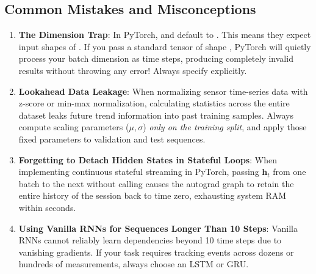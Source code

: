 \subsection{Common Mistakes and Misconceptions}\label{subsec:mistakes}

\begin{warning}
\begin{enumerate}
    \item \textbf{The  Dimension Trap}: In PyTorch,  and  default to . This means they expect input shapes of . If you pass a standard tensor of shape , PyTorch will quietly process your batch dimension as time steps, producing completely invalid results without throwing any error! Always specify  explicitly.
    \item \textbf{Lookahead Data Leakage}: When normalizing sensor time-series data with z-score or min-max normalization, calculating statistics across the entire dataset leaks future trend information into past training samples. Always compute scaling parameters ($\mu, \sigma$) \emph{only on the training split}, and apply those fixed parameters to validation and test sequences.
    \item \textbf{Forgetting to Detach Hidden States in Stateful Loops}: When implementing continuous stateful streaming in PyTorch, passing $\mathbf{h}_t$ from one batch to the next without calling  causes the autograd graph to retain the entire history of the session back to time zero, exhausting system RAM within seconds.
    \item \textbf{Using Vanilla RNNs for Sequences Longer Than 10 Steps}: Vanilla RNNs cannot reliably learn dependencies beyond 10 time steps due to vanishing gradients. If your task requires tracking events across dozens or hundreds of measurements, always choose an LSTM or GRU.
\end{enumerate}
\end{warning}

